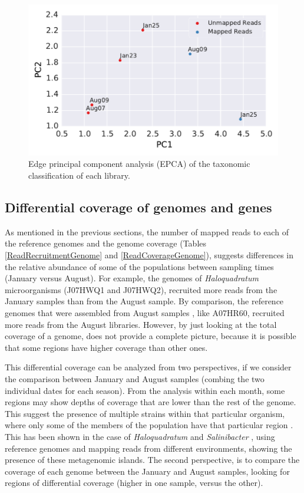 \begin{figure}[hbt]
  \centering
  \includegraphics[width=\textwidth]{Chapter5/Figures/Unmapped_Mapped_EPCA.pdf}
  \caption{Edge principal component analysis (EPCA) of the taxonomic classification of each library.}
  \label{EPCA_results}
\end{figure}


\clearpage
\subsection{Differential coverage of genomes and genes}

As mentioned in the previous sections, the number of mapped reads to each of the reference genomes and the genome coverage (Tables \ref{ReadRecruitmentGenome} and \ref{ReadCoverageGenome}), suggests differences in the relative abundance of some of the populations between sampling times (January versus August). For example, the genomes of \textit{Haloquadratum} microorganisms (J07HWQ1 and J07HWQ2), recruited more reads from the January samples than from the August sample. By comparison, the reference genomes that were assembled from August samples \cite{Podell:2013fp}, like A07HR60, recruited more reads from the August libraries. However, by just looking at the total coverage of a genome, does not provide a complete picture, because it is possible that some regions have higher coverage than other ones.

This differential coverage can be analyzed from two perspectives, if we consider the comparison between January and August samples (combing the two individual dates for each season). From the analysis within each month, some regions may show depths of coverage that are lower than the rest of the genome. This suggest the presence of multiple strains within that particular organism, where only some of the members of the population have that particular region \cite{Pasic:2009bo,Legault:2006kh,Allen:2005dg}. This has been shown in the case of \textit{Haloquadratum} \cite{Legault:2006kh} and \textit{Salinibacter} \cite{Pasic:2009bo}, using reference genomes and mapping reads from different environments, showing the presence of these metagenomic islands. The second perspective, is to compare the coverage of each genome between the January and August samples, looking for regions of differential coverage (higher in one sample, versus the other).

